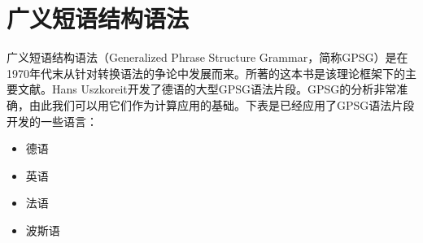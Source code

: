 
\chapter{广义短语结构语法}
\label{Kapitel-GPSG}

广义短语结构语法（Generalized Phrase Structure Grammar，简称GPSG）是在1970年代末从针对转换语法的争论中发展而来。\citet*{GKPS85a}所著的这本书是该理论框架下的主要文献。Hans Uszkoreit开发了德语的大型GPSG语法片段\citeyearpar{Uszkoreit87a}。GPSG的分析非常准确，由此我们可以用它们作为计算应用的基础。下表是已经应用了GPSG语法片段开发的一些语言：
\begin{itemize}
\item 德语 \citep{Weisweber87a-u,WP92b,Naumann87a-u,Naumann88-u-gekauft,Volk88}
\item 英语 \citep*{Evans85a-u,PT85a-u,Phillips92a-u,GCB93a-u}
\item 法语 \citep*{EdSB96a}
\item 波斯语 \citep*{BSM2011a}
\end{itemize}

